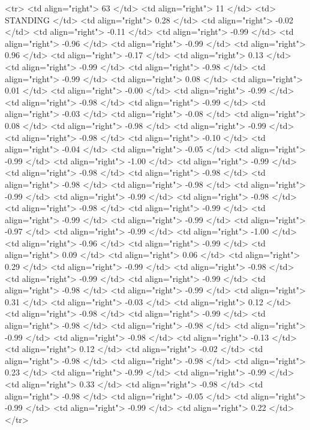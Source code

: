   <tr> <td align="right"> 63 </td> <td align="right">  11 </td> <td> STANDING </td> <td align="right"> 0.28 </td> <td align="right"> -0.02 </td> <td align="right"> -0.11 </td> <td align="right"> -0.99 </td> <td align="right"> -0.96 </td> <td align="right"> -0.99 </td> <td align="right"> 0.96 </td> <td align="right"> -0.17 </td> <td align="right"> 0.13 </td> <td align="right"> -0.99 </td> <td align="right"> -0.98 </td> <td align="right"> -0.99 </td> <td align="right"> 0.08 </td> <td align="right"> 0.01 </td> <td align="right"> -0.00 </td> <td align="right"> -0.99 </td> <td align="right"> -0.98 </td> <td align="right"> -0.99 </td> <td align="right"> -0.03 </td> <td align="right"> -0.08 </td> <td align="right"> 0.08 </td> <td align="right"> -0.98 </td> <td align="right"> -0.99 </td> <td align="right"> -0.98 </td> <td align="right"> -0.10 </td> <td align="right"> -0.04 </td> <td align="right"> -0.05 </td> <td align="right"> -0.99 </td> <td align="right"> -1.00 </td> <td align="right"> -0.99 </td> <td align="right"> -0.98 </td> <td align="right"> -0.98 </td> <td align="right"> -0.98 </td> <td align="right"> -0.98 </td> <td align="right"> -0.99 </td> <td align="right"> -0.99 </td> <td align="right"> -0.98 </td> <td align="right"> -0.98 </td> <td align="right"> -0.99 </td> <td align="right"> -0.99 </td> <td align="right"> -0.99 </td> <td align="right"> -0.97 </td> <td align="right"> -0.99 </td> <td align="right"> -1.00 </td> <td align="right"> -0.96 </td> <td align="right"> -0.99 </td> <td align="right"> 0.09 </td> <td align="right"> 0.06 </td> <td align="right"> 0.29 </td> <td align="right"> -0.99 </td> <td align="right"> -0.98 </td> <td align="right"> -0.99 </td> <td align="right"> -0.99 </td> <td align="right"> -0.98 </td> <td align="right"> -0.99 </td> <td align="right"> 0.31 </td> <td align="right"> -0.03 </td> <td align="right"> 0.12 </td> <td align="right"> -0.98 </td> <td align="right"> -0.99 </td> <td align="right"> -0.98 </td> <td align="right"> -0.98 </td> <td align="right"> -0.99 </td> <td align="right"> -0.98 </td> <td align="right"> -0.13 </td> <td align="right"> 0.12 </td> <td align="right"> -0.02 </td> <td align="right"> -0.98 </td> <td align="right"> -0.98 </td> <td align="right"> 0.23 </td> <td align="right"> -0.99 </td> <td align="right"> -0.99 </td> <td align="right"> 0.33 </td> <td align="right"> -0.98 </td> <td align="right"> -0.98 </td> <td align="right"> -0.05 </td> <td align="right"> -0.99 </td> <td align="right"> -0.99 </td> <td align="right"> 0.22 </td> </tr>
